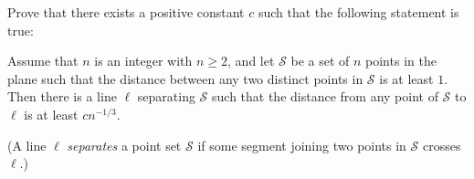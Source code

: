 Prove that there exists a positive constant $c$ such that the following statement is true:

Assume that $n$ is an integer with $n \geq 2$, and let $\mathcal{S}$ be a set of $n$ points in the plane such that the distance between any two distinct points in $\mathcal{S}$ is at least $1$. Then there is a line $\ell$ separating $\mathcal{S}$ such that the distance from any point of $\mathcal{S}$ to $\ell$ is at least $cn^{-1/3}$.

(A line $\ell$ \emph{separates} a point set $\mathcal{S}$ if some segment joining two points in $\mathcal{S}$ crosses $\ell$.)
